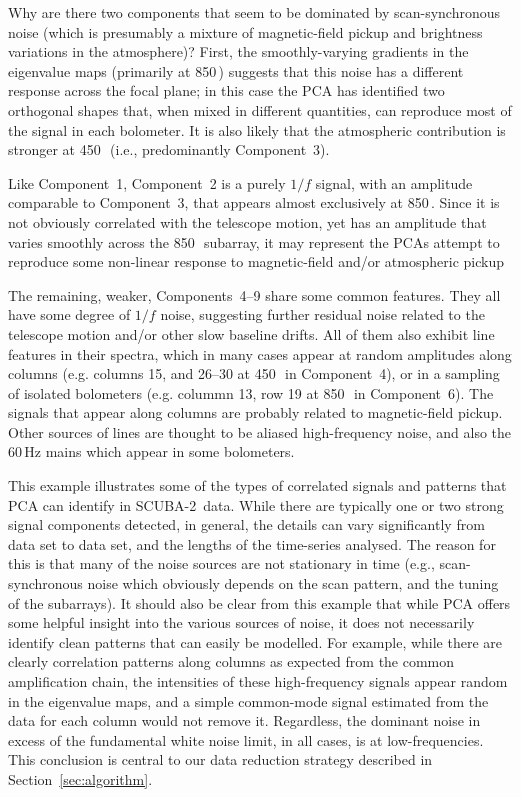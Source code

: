 \documentclass[useAMS,usenatbib,nofootinbib]{mn2e}
\newcommand{\scuba}{SCUBA-2}
\begin{document}
Why are there two components that seem to be dominated by
scan-synchronous noise (which is presumably a mixture of
magnetic-field pickup and brightness variations in the atmosphere)?
First, the smoothly-varying gradients in the eigenvalue maps
(primarily at 850\,\micron) suggests that this noise has a different
response across the focal plane; in this case the PCA has identified
two orthogonal shapes that, when mixed in different quantities, can
reproduce most of the signal in each bolometer. It is also likely that
the atmospheric contribution is stronger at 450\,\micron\ (i.e.,
predominantly Component~3).

Like Component~1, Component~2 is a purely $1/f$ signal, with an
amplitude comparable to Component~3, that appears almost exclusively
at 850\,\micron. Since it is not obviously correlated with the
telescope motion, yet has an amplitude that varies smoothly across the
850\,\micron\ subarray, it may represent the PCAs attempt to reproduce
some non-linear response to magnetic-field and/or atmospheric pickup

The remaining, weaker, Components~4--9 share some common
features. They all have some degree of $1/f$ noise, suggesting further
residual noise related to the telescope motion and/or other slow
baseline drifts. All of them also exhibit line features in their
spectra, which in many cases appear at random amplitudes along columns
(e.g. columns 15, and 26--30 at 450\,\micron\ in Component~4), or in a
sampling of isolated bolometers (e.g. colummn 13, row 19 at
850\,\micron\ in Component~6). The signals that appear along columns
are probably related to magnetic-field pickup. Other sources of lines
are thought to be aliased high-frequency noise, and also the 60\,Hz
mains which appear in some bolometers.

This example illustrates some of the types of correlated signals and
patterns that PCA can identify in \scuba\ data. While there are
typically one or two strong signal components detected, in general,
the details can vary significantly from data set to data set, and the
lengths of the time-series analysed. The reason for this is that many
of the noise sources are not stationary in time (e.g.,
scan-synchronous noise which obviously depends on the scan pattern,
and the tuning of the subarrays). It should also be clear from this
example that while PCA offers some helpful insight into the various
sources of noise, it does not necessarily identify clean patterns that
can easily be modelled. For example, while there are clearly
correlation patterns along columns as expected from the common
amplification chain, the intensities of these high-frequency signals
appear random in the eigenvalue maps, and a simple common-mode signal
estimated from the data for each column would not remove
it. Regardless, the dominant noise in excess of the fundamental white
noise limit, in all cases, is at low-frequencies. This conclusion is
central to our data reduction strategy described in
Section~\ref{sec:algorithm}.
\end{document}
